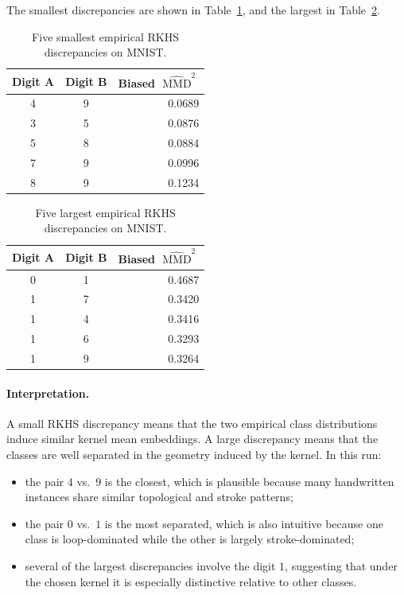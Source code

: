 \documentclass[11pt]{article}
\newcommand{\MMD}{\operatorname{MMD}}
\begin{document}
The smallest discrepancies are shown in Table~\ref{tab:smallest-mmd}, and the largest in Table~\ref{tab:largest-mmd}.

\begin{table}[h]
\centering
\caption{Five smallest empirical RKHS discrepancies on MNIST.}
\label{tab:smallest-mmd}
\begin{tabular}{ccr}
\toprule
Digit A & Digit B & Biased $\widehat{\MMD}^2$ \\
\midrule
4 & 9 & 0.0689 \\
3 & 5 & 0.0876 \\
5 & 8 & 0.0884 \\
7 & 9 & 0.0996 \\
8 & 9 & 0.1234 \\
\bottomrule
\end{tabular}
\end{table}

\begin{table}[h]
\centering
\caption{Five largest empirical RKHS discrepancies on MNIST.}
\label{tab:largest-mmd}
\begin{tabular}{ccr}
\toprule
Digit A & Digit B & Biased $\widehat{\MMD}^2$ \\
\midrule
0 & 1 & 0.4687 \\
1 & 7 & 0.3420 \\
1 & 4 & 0.3416 \\
1 & 6 & 0.3293 \\
1 & 9 & 0.3264 \\
\bottomrule
\end{tabular}
\end{table}

\paragraph{Interpretation.}
A small RKHS discrepancy means that the two empirical class distributions induce similar kernel mean embeddings. A large discrepancy means that the classes are well separated in the geometry induced by the kernel. In this run:
\begin{itemize}
\item the pair $4$ vs.\ $9$ is the closest, which is plausible because many handwritten instances share similar topological and stroke patterns;
\item the pair $0$ vs.\ $1$ is the most separated, which is also intuitive because one class is loop-dominated while the other is largely stroke-dominated;
\item several of the largest discrepancies involve the digit $1$, suggesting that under the chosen kernel it is especially distinctive relative to other classes.
\end{itemize}
\end{document}

